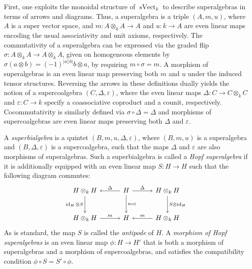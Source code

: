 \documentclass[11pt,a4paper,reqno,noamsfonts]{amsart}
\numberwithin{equation}{section}
\theoremstyle{definition}
\theoremstyle{remark}
\DeclareMathOperator{\id}{id}
\DeclareMathOperator{\sVect}{sVect}
\begin{document}
First, one exploits the monoidal structure of $\sVect_k$ to describe superalgebras in terms of arrows and diagrams. Thus, a superalgebra is a triple $(A,m,u)$, where $A$ is a super vector space, and $m \colon A \otimes_k A \to A$ and $u \colon k \to A$ are even linear maps encoding the usual associativity and unit axioms, respectively. The commutativity of a superalgebra can be expressed via the graded flip $\sigma \colon A \otimes_k A \to A \otimes_k A$, given on homogeneous elements by $\sigma (a \otimes b) = (-1)^{\lvert a \rvert \lvert b \rvert} b \otimes a$, by requiring $m \circ \sigma = m$. A morphism of superalgebras is an even linear map preserving both $m$ and $u$ under the induced tensor structures. Reversing the arrows in these definitions dually yields the notion of a supercoalgebra $(C,\Delta,\varepsilon)$, where the even linear maps $\Delta \colon C \to C \otimes_k C$ and $\varepsilon \colon C \to k$ specify a coassociative coproduct and a counit, respectively. Cocommutativity is similarly defined via $\sigma \circ \Delta = \Delta$ and morphisms of supercoalgebras are even linear maps preserving both $\Delta$ and $\varepsilon$.

A \emph{superbialgebra} is a quintet $(B,m,u,\Delta,\varepsilon)$, where $(B,m,u)$ is a superalgebra and $(B,\Delta,\varepsilon)$ is a supercoalgebra, such that the maps $\Delta$ and $\varepsilon$ are also morphisms of superalgebras. Such a superbialgebra is called a \emph{Hopf superalgebra} if it is additionally equipped with an even linear map $S \colon H \to H$ such that the following diagram commutes:
\begin{equation}
\begin{tikzcd}[row sep=2.5em, column sep=3.0em]
H \otimes_k H  \arrow[d,-{To[length=2.5pt, width=4pt]},"\id_H \otimes S"'] &
H \arrow[l,-{To[length=2.5pt, width=4pt]},"\Delta"'] \arrow[r,-{To[length=2.5pt, width=4pt]},"\Delta"] \arrow[d,-{To[length=2.5pt, width=4pt]},"u \circ \varepsilon"] &
H \otimes_k H \arrow[d,-{To[length=2.5pt, width=4pt]},"S \otimes \id_H"] \\
H \otimes_k H \arrow[r,-{To[length=2.5pt, width=4pt]},"m"] &
H &
H \otimes_k H  \arrow[l,-{To[length=2.5pt, width=4pt]},"m"'] 
\end{tikzcd}
\end{equation}
As is standard, the map $S$ is called the \emph{antipode} of $H$. A \emph{morphism of Hopf superalgebras} is an even linear map $\phi \colon H \to H'$ that is both a morphism of superalgebras and a morphism of supercoalgebras, and satisfies the compatibility condition $\phi \circ S = S' \circ \phi$. 
\end{document}
